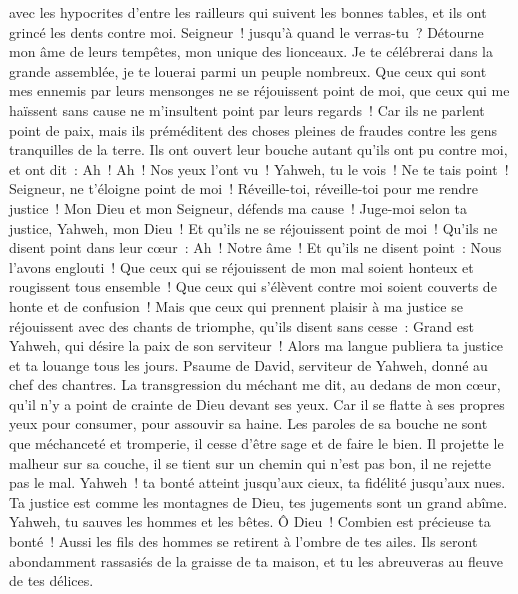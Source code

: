 \begin{multicols}{2}
avec les hypocrites d'entre les railleurs qui suivent les bonnes tables, et ils ont grincé les dents contre moi.
Seigneur~! jusqu'à quand le verras-tu~? Détourne mon âme de leurs tempêtes, mon unique des lionceaux.
Je te célébrerai dans la grande assemblée, je te louerai parmi un peuple nombreux.
Que ceux qui sont mes ennemis par leurs mensonges ne se réjouissent point de moi, que ceux qui me haïssent sans cause ne m'insultent point par leurs regards~!
Car ils ne parlent point de paix, mais ils préméditent des choses pleines de fraudes contre les gens tranquilles de la terre.
Ils ont ouvert leur bouche autant qu'ils ont pu contre moi, et ont dit~: Ah~! Ah~! Nos yeux l'ont vu~!
Yahweh, tu le vois~! Ne te tais point~! Seigneur, ne t'éloigne point de moi~!
Réveille-toi, réveille-toi pour me rendre justice~! Mon Dieu et mon Seigneur, défends ma cause~!
Juge-moi selon ta justice, Yahweh, mon Dieu~! Et qu'ils ne se réjouissent point de moi~!
Qu'ils ne disent point dans leur cœur~: Ah~! Notre âme~! Et qu'ils ne disent point~: Nous l'avons englouti~!
Que ceux qui se réjouissent de mon mal soient honteux et rougissent tous ensemble~! Que ceux qui s'élèvent contre moi soient couverts de honte et de confusion~!
Mais que ceux qui prennent plaisir à ma justice se réjouissent avec des chants de triomphe, qu'ils disent sans cesse~: Grand est Yahweh, qui désire la paix de son serviteur~!
Alors ma langue publiera ta justice et ta louange tous les jours.
\VerseOne{}Psaume de David, serviteur de Yahweh, donné au chef des chantres.
La transgression du méchant me dit, au dedans de mon cœur, qu'il n'y a point de crainte de Dieu devant ses yeux.
Car il se flatte à ses propres yeux pour consumer, pour assouvir sa haine.
Les paroles de sa bouche ne sont que méchanceté et tromperie, il cesse d'être sage et de faire le bien.
Il projette le malheur sur sa couche, il se tient sur un chemin qui n'est pas bon, il ne rejette pas le mal.
Yahweh~! ta bonté atteint jusqu'aux cieux, ta fidélité jusqu'aux nues.
Ta justice est comme les montagnes de Dieu, tes jugements sont un grand abîme. Yahweh, tu sauves les hommes et les bêtes.
Ô Dieu~! Combien est précieuse ta bonté~! Aussi les fils des hommes se retirent à l'ombre de tes ailes.
Ils seront abondamment rassasiés de la graisse de ta maison, et tu les abreuveras au fleuve de tes délices.

\end{multicols}
